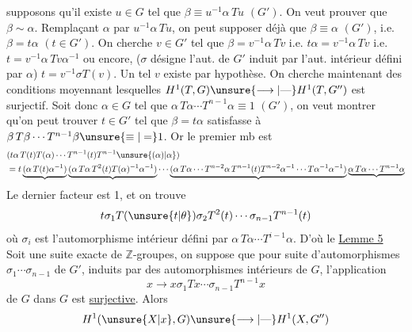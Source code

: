 supposons qu'il existe $u\in G$ tel que $\beta\equiv u^{-1}\alpha\,Tu$ $(G')$.
On veut prouver que $\beta\sim\alpha$. Remplaçant $\alpha$ par $u^{-1}\alpha\,Tu$, on peut supposer déjà que $\beta\equiv\alpha$ $(G')$, i.e. $\beta=t\alpha$ $(t\in G')$.
On cherche $v\in G'$ tel que $\beta=v^{-1}\alpha\,Tv$ i.e. $t\alpha=v^{-1}\alpha\,Tv$ i.e. $t=v^{-1}\alpha\,Tv\alpha^{-1}$ ou encore, ($\sigma$ désigne l'aut. de $G'$ induit par l'aut. intérieur défini par $\alpha$) $t=v^{-1}\sigma T(v)$. Un tel $v$ existe par hypothèse.
On cherche maintenant des conditions moyennant lesquelles $H^1(T,G)\unsure{\longrightarrow|\text{---}}H^1(T,G'')$ est surjectif. Soit donc $\alpha\in G$ tel que $\alpha\,T\alpha\cdots T^{n-1}\alpha\equiv1$ $(G')$, on veut montrer qu'on peut trouver $t\in G'$ tel que $\beta=t\alpha$ satisfasse à $\beta\,T\beta\cdots T^{n-1}\beta\unsure{\equiv|=}1$. Or le premier mb est
\[
\begin{aligned}
&(t\alpha\,T(t)T(\alpha)\cdots T^{n-1}(t)T^{n-1}\unsure{(\alpha)|\alpha})\\
&=t\underbrace{(\alpha\,T(t)\alpha^{-1})}\underbrace{(\alpha\,T\alpha\,T^2(t)T(\alpha)^{-1}\alpha^{-1})}\cdots\underbrace{(\alpha\,T\alpha\cdots T^{n-2}\alpha\,T^{n-1}(t)T^{n-2}\alpha^{-1}\cdots T\alpha^{-1}\alpha^{-1})}\underbrace{\alpha\,T\alpha\cdots T^{n-1}\alpha}
\end{aligned}
\]
Le dernier facteur est 1, et on trouve
\[
t\sigma_1T(\unsure{t|\theta})\sigma_2T^2(t)\cdots\sigma_{n-1}T^{n-1}(t)
\]
où $\sigma_i$ est l'automorphisme intérieur défini par $\alpha\,T\alpha\cdots T^{i-1}\alpha$. D'où le 
\uline{Lemme 5} Soit
une suite exacte de $\mathbb Z$-groupes, on suppose que pour  suite d'automorphismes $\sigma_1\cdots\sigma_{n-1}$ de $G'$, induits par des automorphismes intérieurs de $G$, l'application
\[
x\longrightarrow x\sigma_1Tx\cdots\sigma_{n-1}T^{n-1}x
\]
de $G$ dans $G$ est \uline{surjective}.
Alors
\[
H^1(\unsure{X|x},G)\unsure{\longrightarrow|\text{---}}H^1(X,G'')
\]

